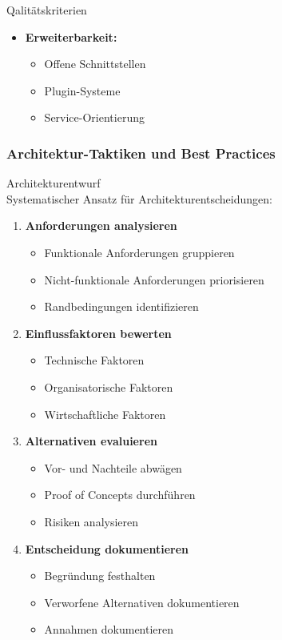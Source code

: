 \begin{theorem}{Qalitätskriterien}
\begin{itemize}
    \item \textbf{Erweiterbarkeit:}
    \begin{itemize}
        \item Offene Schnittstellen
        \item Plugin-Systeme
        \item Service-Orientierung
    \end{itemize}
\end{itemize}
\end{theorem}

\subsubsection{Architektur-Taktiken und Best Practices}

\begin{KR}{Architekturentwurf}\\
Systematischer Ansatz für Architekturentscheidungen:
\begin{enumerate}
    \item \textbf{Anforderungen analysieren}
    \begin{itemize}
        \item Funktionale Anforderungen gruppieren
        \item Nicht-funktionale Anforderungen priorisieren
        \item Randbedingungen identifizieren
    \end{itemize}
    
    \item \textbf{Einflussfaktoren bewerten}
    \begin{itemize}
        \item Technische Faktoren
        \item Organisatorische Faktoren
        \item Wirtschaftliche Faktoren
    \end{itemize}
    
    \item \textbf{Alternativen evaluieren}
    \begin{itemize}
        \item Vor- und Nachteile abwägen
        \item Proof of Concepts durchführen
        \item Risiken analysieren
    \end{itemize}
    
    \item \textbf{Entscheidung dokumentieren}
    \begin{itemize}
        \item Begründung festhalten
        \item Verworfene Alternativen dokumentieren
        \item Annahmen dokumentieren
    \end{itemize}
\end{enumerate}
\end{KR}

